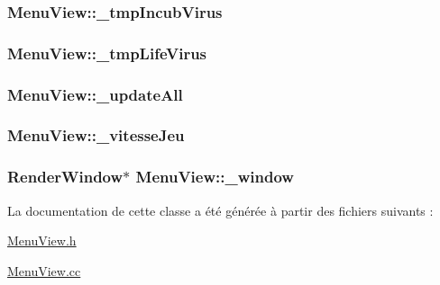 \label{classMenuView_a0bd235fdfcd954c55a4c5f473fc929de}
\hypertarget{classMenuView_a6a8e198f883ccc85a9e2920975e975b7}{
\subsubsection[{\_\-tmpIncubVirus}]{ {\bf MenuView::\_\-tmpIncubVirus}}}
\label{classMenuView_a6a8e198f883ccc85a9e2920975e975b7}
\hypertarget{classMenuView_a5ffd50183f18befa3939aa95a94582f1}{
\subsubsection[{\_\-tmpLifeVirus}]{ {\bf MenuView::\_\-tmpLifeVirus}}}
\label{classMenuView_a5ffd50183f18befa3939aa95a94582f1}
\hypertarget{classMenuView_a516ac9fa81f55e155e791e7289beef7e}{
\subsubsection[{\_\-updateAll}]{ {\bf MenuView::\_\-updateAll}}}
\label{classMenuView_a516ac9fa81f55e155e791e7289beef7e}
\hypertarget{classMenuView_a459ca483b65ce8e5b8de24413d332f92}{
\subsubsection[{\_\-vitesseJeu}]{ {\bf MenuView::\_\-vitesseJeu}}}
\label{classMenuView_a459ca483b65ce8e5b8de24413d332f92}
\hypertarget{classMenuView_a038a98b254b2c5b95217f0effbe0e289}{
\subsubsection[{\_\-window}]{\setlength{\rightskip}{0pt plus 5cm}RenderWindow$\ast$ {\bf MenuView::\_\-window}}}
\label{classMenuView_a038a98b254b2c5b95217f0effbe0e289}


La documentation de cette classe a été générée à partir des fichiers suivants :\begin{DoxyCompactItemize}
\item 
\hyperlink{MenuView_8h}{MenuView.h}\item 
\hyperlink{MenuView_8cc}{MenuView.cc}\end{DoxyCompactItemize}
